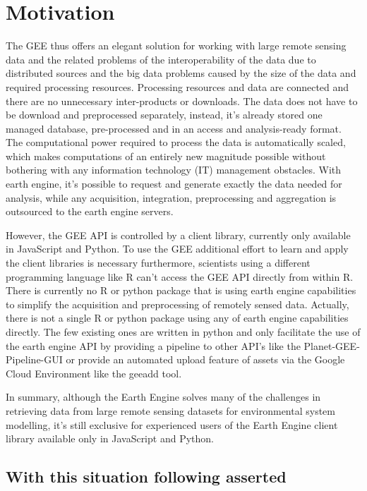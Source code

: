 \documentclass[11pt,twoside,a4paper,final]{report}
\begin{document}
\section{Motivation}

The GEE thus offers an elegant solution for working with large remote sensing data and the related problems of the interoperability of the data due to distributed sources and the big data problems caused by the size of the data and required processing resources. 
Processing resources and data are connected and there are no unnecessary inter-products or downloads. 
The data does not have to be download and preprocessed separately, instead, it's already stored one managed database, pre-processed and in an access and analysis-ready format. 
The computational power required to process the data is automatically scaled, which makes computations of an entirely new magnitude possible without bothering with any information technology (IT) management obstacles.
With earth engine, it's possible to request and generate exactly the data needed for analysis, while any acquisition, integration, preprocessing and aggregation is outsourced to the earth engine servers. 
 
However, the GEE API is controlled by a client library, currently only available in JavaScript and Python. To use the GEE additional effort to learn and apply the client libraries is necessary furthermore, scientists using a different programming language like R can't access the GEE API directly from within R.
There is currently no R or python package that is using earth engine capabilities to simplify the acquisition and preprocessing of remotely sensed data. Actually, there is not a single R or python package using any of earth engine capabilities directly. The few existing ones are written in python and only facilitate the use of the earth engine API by providing a pipeline to other API's like the Planet-GEE-Pipeline-GUI or provide an automated upload feature of assets via the Google Cloud Environment like the geeadd tool.

In summary, although the Earth Engine solves many of the challenges in retrieving data from large remote sensing datasets for environmental system modelling, it's still exclusive for experienced users of the Earth Engine client library available only in JavaScript and Python.

\subsection{With this situation following asserted}
\end{document}
